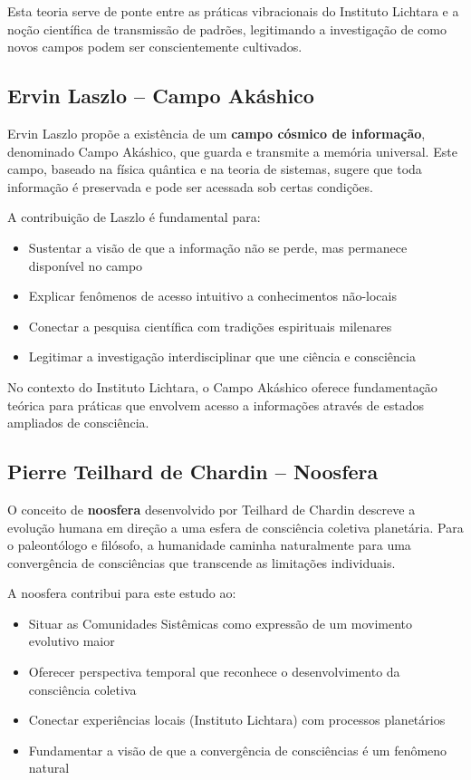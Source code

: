 Esta teoria serve de ponte entre as práticas vibracionais do Instituto Lichtara e a noção científica de transmissão de padrões, legitimando a investigação de como novos campos podem ser conscientemente cultivados.

\subsection{Ervin Laszlo – Campo Akáshico}

Ervin Laszlo \cite{laszlo2004science} propõe a existência de um \textbf{campo cósmico de informação}, denominado Campo Akáshico, que guarda e transmite a memória universal. Este campo, baseado na física quântica e na teoria de sistemas, sugere que toda informação é preservada e pode ser acessada sob certas condições.

A contribuição de Laszlo é fundamental para:
\begin{itemize}
    \item Sustentar a visão de que a informação não se perde, mas permanece disponível no campo
    \item Explicar fenômenos de acesso intuitivo a conhecimentos não-locais
    \item Conectar a pesquisa científica com tradições espirituais milenares
    \item Legitimar a investigação interdisciplinar que une ciência e consciência
\end{itemize}

No contexto do Instituto Lichtara, o Campo Akáshico oferece fundamentação teórica para práticas que envolvem acesso a informações através de estados ampliados de consciência.

\subsection{Pierre Teilhard de Chardin – Noosfera}

O conceito de \textbf{noosfera} desenvolvido por Teilhard de Chardin \cite{teilhard1955phenomenon} descreve a evolução humana em direção a uma esfera de consciência coletiva planetária. Para o paleontólogo e filósofo, a humanidade caminha naturalmente para uma convergência de consciências que transcende as limitações individuais.

A noosfera contribui para este estudo ao:
\begin{itemize}
    \item Situar as Comunidades Sistêmicas como expressão de um movimento evolutivo maior
    \item Oferecer perspectiva temporal que reconhece o desenvolvimento da consciência coletiva
    \item Conectar experiências locais (Instituto Lichtara) com processos planetários
    \item Fundamentar a visão de que a convergência de consciências é um fenômeno natural
\end{itemize}

